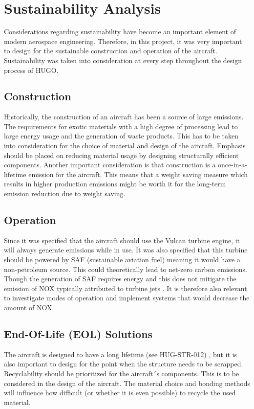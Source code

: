 
\chapter{Sustainability Analysis}
Considerations regarding sustainability have become an important element of modern aerospace engineering. Therefore, in this project, it was very important to design for the sustainable construction and operation of the aircraft. Sustainability was taken into consideration at every step throughout the design process of HUGO. 

\section{Construction}

Historically, the construction of an aircraft has been a source of large emissions. The requirements for exotic materials with a high degree of processing lead to large energy usage and the generation of waste products. This has to be taken into consideration for the choice of material and design of the aircraft. Emphasis should be placed on reducing material usage by designing structurally efficient components. Another important consideration is that construction is a once-in-a-lifetime emission for the aircraft. This means that a weight saving measure which results in higher production emissions might be worth it for the long-term emission reduction due to weight saving.  

\section{Operation}
Since it was specified that the aircraft should use the Vulcan turbine engine, it will always generate emissions while in use. It was also specified that this turbine should be powered by SAF (sustainable aviation fuel) meaning it would have a non-petroleum source. This could theoretically lead to net-zero carbon emissions. Though the generation of SAF requires energy and this does not mitigate the emission of NOX typically attributed to turbine jets \cite{Jarin2024}. It is therefore also relevant to investigate modes of operation and implement systems that would decrease the amount of NOX.      


\section{End-Of-Life (EOL) Solutions}

The aircraft is designed to have a long lifetime (see HUG-STR-012) , but it is also important to design for the point when the structure needs to be scrapped. Recyclability should be prioritized for  the aircraft´s components. This is to be considered in the design of the aircraft. The material choice and bonding methods will influence how difficult (or whether it is even possible) to recycle the used material. 


